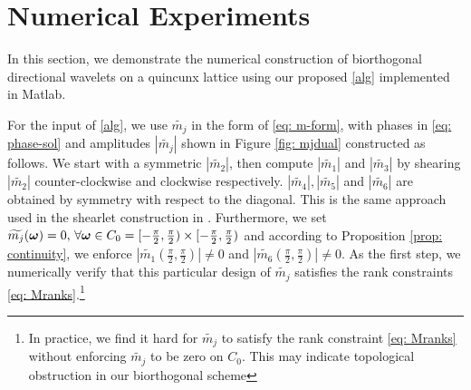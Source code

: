 \begin{comment}
\subsection{solving $m_i$}
In the final step, we substitute $\mc{0}$ and $m_0^C(\V{\omega})$ into \eqref{eq: LS-new} and rewrite it into the following linear system,
\begin{align}\label{eq: mi}
\overline{\M}[:,2:7]\,\mathbf{m}[2:7](\V{\omega}) = 
\begin{bmatrix}
1-m_0^C\overline{\widetilde{m_0}^C}(\V{\omega})\\
0\\
-m_0^C\overline{\widetilde{m_0}^C}(\V{\omega}+\V{\pi}_2)\\
\vdots \\
0
\end{bmatrix}
=:\mathbf{b}(\V{\omega}).
\end{align}
The solution of \eqref{eq: mi} depends only on $m_0^C\overline{\widetilde{m_0}^C}$, or equivalently $m_0\overline{\widetilde{m_0}}$. 
\end{comment}

\section{Numerical Experiments}\label{sec: numerics}

In this section, we demonstrate the numerical construction of biorthogonal directional wavelets on a quincunx lattice using our proposed \ref{alg} implemented in Matlab.

For the input of \ref{alg}, we use $\widetilde{m_j}$ in the form of \eqref{eq: m-form}, with phases in \eqref{eq: phase-sol} and amplitudes $|\widetilde{m_j}|$ shown in Figure \ref{fig: mjdual} constructed as follows. We start with a symmetric $|\widetilde{m_2}|$, then compute $|\widetilde{m_1}|$ and $|\widetilde{m_3}|$ by shearing $|\widetilde{m_2}|$ counter-clockwise and clockwise respectively. $|\widetilde{m_4}|, |\widetilde{m_5}|$ and $|\widetilde{m_6}|$ are obtained by symmetry with respect to the diagonal. This is the same approach used in the shearlet construction in \cite{kutyniok2012digital}. Furthermore, we set $\widetilde{m_{j}}(\boldsymbol{\omega}) = 0,\,\forall \boldsymbol{\omega}\in C_0 = [-\frac{\pi}{2},\frac{\pi}{2})\times [-\frac{\pi}{2},\frac{\pi}{2})$ and according to Proposition \ref{prop: continuity}, we enforce $|\widetilde{m_1}(\frac{\pi}{2},\frac{\pi}{2})|\neq 0$ and $|\widetilde{m_6}(\frac{\pi}{2},\frac{\pi}{2})|\neq 0$. As the first step, we numerically verify that this particular design of $\widetilde{m_j}$ satisfies the rank constraints \eqref{eq: Mranks}.\footnote{In practice, we find it hard for $\widetilde{m_j}$ to satisfy the rank constraint \eqref{eq: Mranks} without enforcing $\widetilde{m_j}$ to be zero on $C_0$. This may indicate topological obstruction in our biorthogonal scheme}

